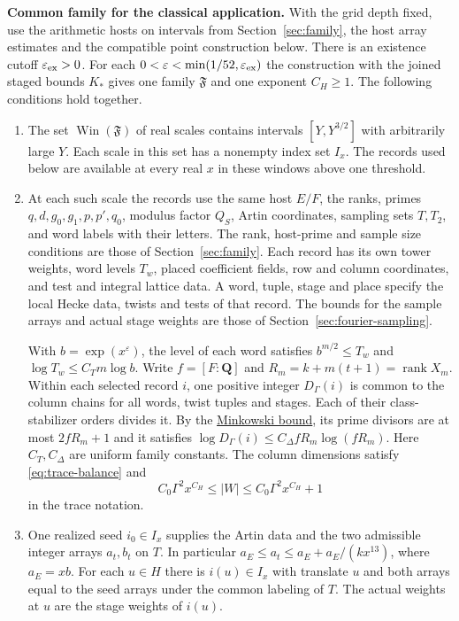 \medskip
\noindent
{}%
\textbf{Common family for the classical application.}
With the grid depth fixed, use the arithmetic hosts on intervals from
Section~\ref{sec:family}, the host array estimates and the compatible
point construction below. There is an existence cutoff
\(\varepsilon_{\rm ex}>0\). For each
\(0<\varepsilon<\min(1/52,\varepsilon_{\rm ex})\) the construction with
the joined staged bounds \(K_*\) gives one family \(\mathfrak F\) and
one exponent \(C_H\ge1\). The following conditions hold together.

\begin{enumerate}
\item The set \(\operatorname{Win}(\mathfrak F)\) of real scales
contains intervals \([Y,Y^{3/2}]\) with arbitrarily large \(Y\).
Each scale in this set has a nonempty index set \(I_x\). The records
used below are available at every real \(x\) in these windows above
one threshold.

\item At each such scale the records use the same host \(E/F\),
the ranks, primes \(q,d,g_0,g_1,p,p',q_0\), modulus factor \(Q_S\),
Artin coordinates, sampling sets \(T,T_2\), and word labels with their
letters. The rank, host-prime and sample size conditions are those
of Section~\ref{sec:family}. Each record has its own tower weights,
word levels \(T_w\), placed coefficient fields, row and column
coordinates, and test and integral lattice data. A word, tuple, stage
and place specify the local Hecke data, twists and tests of that
record. The bounds for the sample arrays and actual stage weights
are those of Section~\ref{sec:fourier-sampling}.

With \(b=\exp(x^\varepsilon)\), the level of each word satisfies
\(b^{m/2}\le T_w\) and \(\log T_w\le C_T m\log b\).
Write \(f=[F:\mathbf Q]\) and \(R_m=k+m(t+1)=\operatorname{rank}X_m\).
Within each selected record \(i\), one positive integer \(D_\Gamma(i)\)
is common to the column chains for all words, twist tuples and stages.
Each of their class-stabilizer orders divides it. By the
\hyperlink{proof.selection-stabilizer-multiple}{Minkowski bound}, its
prime divisors are at most \(2fR_m+1\) and it satisfies
\(\log D_\Gamma(i)\le C_\Delta fR_m\log(fR_m)\).
Here \(C_T,C_\Delta\) are uniform family constants.
The column dimensions satisfy \eqref{eq:trace-balance} and
\[
 C_0\Gamma^2x^{C_H}\le |W|\le C_0\Gamma^2x^{C_H}+1
\]
in the trace notation.

\item One realized seed \(i_0\in I_x\) supplies the Artin data and the
two admissible integer arrays \(a_t,b_t\) on \(T\). In particular
\(a_E\le a_t\le a_E+a_E/(kx^{13})\), where \(a_E=xb\).
For each \(u\in H\) there is \(i(u)\in I_x\) with translate \(u\) and
both arrays equal to the seed arrays under the common labeling of \(T\).
The actual weights at \(u\) are the stage weights of \(i(u)\).
\end{enumerate}

